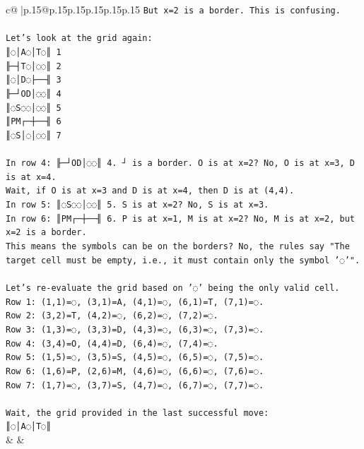 \documentclass{article}
\begin{document}
{\begin{supertabular}{c@{$\;$}|p{.15\linewidth}@{}p{.15\linewidth}p{.15\linewidth}p{.15\linewidth}p{.15\linewidth}p{.15\linewidth}}
{{{\texttt{But x=2 is a border. This is confusing.} \\
\\ 
\texttt{Let's look at the grid again:} \\
\texttt{║◌│A◌│T◌║ 1} \\
\texttt{╟─┤T◌│◌◌║ 2} \\
\texttt{║◌│D◌├──╢ 3} \\
\texttt{╟─┘OD│◌◌║ 4} \\
\texttt{║◌S◌◌│◌◌║ 5} \\
\texttt{║PM┌─┼──╢ 6} \\
\texttt{║◌S│◌│◌◌║ 7} \\
\\ 
\texttt{In row 4: ╟─┘OD│◌◌║ 4. ┘ is a border. O is at x=2? No, O is at x=3, D is at x=4.} \\
\texttt{Wait, if O is at x=3 and D is at x=4, then D is at (4,4).} \\
\texttt{In row 5: ║◌S◌◌│◌◌║ 5. S is at x=2? No, S is at x=3.} \\
\texttt{In row 6: ║PM┌─┼──╢ 6. P is at x=1, M is at x=2? No, M is at x=2, but x=2 is a border.} \\
\texttt{This means the symbols can be on the borders? No, the rules say "The target cell must be empty, i.e., it must contain only the symbol '◌'".} \\
\\ 
\texttt{Let's re{-}evaluate the grid based on '◌' being the only valid cell.} \\
\texttt{Row 1: (1,1)=◌, (3,1)=A, (4,1)=◌, (6,1)=T, (7,1)=◌.} \\
\texttt{Row 2: (3,2)=T, (4,2)=◌, (6,2)=◌, (7,2)=◌.} \\
\texttt{Row 3: (1,3)=◌, (3,3)=D, (4,3)=◌, (6,3)=◌, (7,3)=◌.} \\
\texttt{Row 4: (3,4)=O, (4,4)=D, (6,4)=◌, (7,4)=◌.} \\
\texttt{Row 5: (1,5)=◌, (3,5)=S, (4,5)=◌, (6,5)=◌, (7,5)=◌.} \\
\texttt{Row 6: (1,6)=P, (2,6)=M, (4,6)=◌, (6,6)=◌, (7,6)=◌.} \\
\texttt{Row 7: (1,7)=◌, (3,7)=S, (4,7)=◌, (6,7)=◌, (7,7)=◌.} \\
\\ 
\texttt{Wait, the grid provided in the last successful move:} \\
\texttt{║◌│A◌│T◌║} \\
            }
        }
    }
    & & \\ \\


\end{supertabular}}
\end{document}
